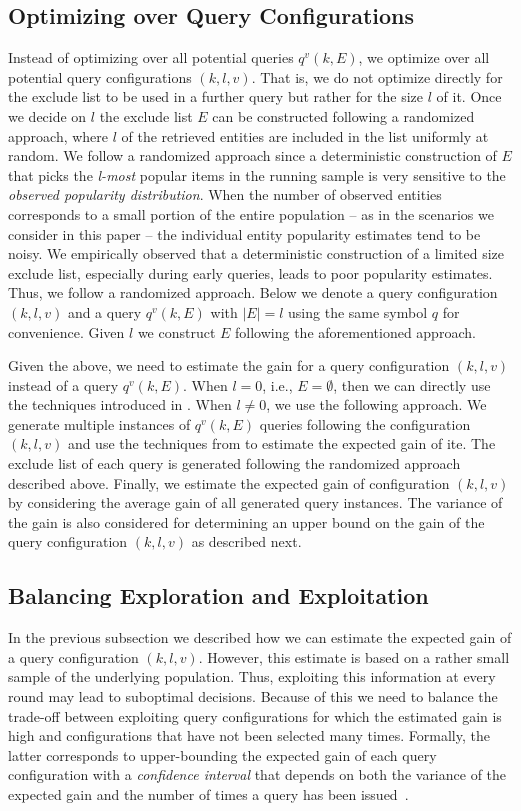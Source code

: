 \subsection{Optimizing over Query Configurations}
\label{sec:config}
Instead of optimizing over all potential queries $q^v(k,E)$, we optimize over all potential query configurations $(k,l,v)$. That is, we do not optimize directly for the exclude list to be used in a further query but rather for the size $l$ of it. Once we decide on $l$ the exclude list $E$ can be constructed following a randomized approach, where $l$ of the retrieved entities are included in the list uniformly at random. We follow a randomized approach since a deterministic construction of $E$ that picks the {\em l-most} popular items in the running sample is very sensitive to the {\em observed popularity distribution}. When the number of observed entities corresponds to a small portion of the entire population -- as in the scenarios we consider in this paper -- the individual entity popularity estimates tend to be noisy.  We empirically observed that a deterministic construction of a limited size exclude list, especially during early queries, leads to poor popularity estimates. Thus, we follow a randomized approach. Below we denote a query configuration $(k,l,v)$ and a query $q^v(k,E)$ with $|E| = l$ using the same symbol $q$ for convenience. Given $l$ we construct $E$ following the aforementioned approach.

Given the above, we need to estimate the gain for a query configuration $(k,l,v)$ instead of a query $q^v(k,E)$. When $l = 0$, i.e., $E = \emptyset$, then we can directly use the techniques introduced in . When $l \neq 0$, we use the following approach. We generate multiple instances of $q^v(k,E)$ queries following the configuration $(k,l,v)$ and use the techniques from  to estimate the expected gain of ite. The exclude list of each query is generated following the randomized approach described above. Finally, we estimate the expected gain of configuration $(k,l,v)$ by considering the average gain of all generated query instances. The variance of the gain is also considered for determining an upper bound on the gain of the query configuration $(k,l,v)$ as described next.

\subsection{Balancing Exploration and Exploitation}
\label{sec:balancing}
In the previous subsection we described how we can estimate the expected gain of a query configuration $(k,l,v)$. However, this estimate is based on a rather small sample of the underlying population. Thus, exploiting this information at every round may lead to suboptimal decisions. Because of this we need to balance the trade-off between exploiting query configurations for which the estimated gain is high and configurations that have not been selected many times. Formally, the latter corresponds to upper-bounding the expected gain of each query configuration with a {\em confidence interval} that depends on both the variance of the expected gain and the number of times a query has been issued~\cite{Auer:2003}.

